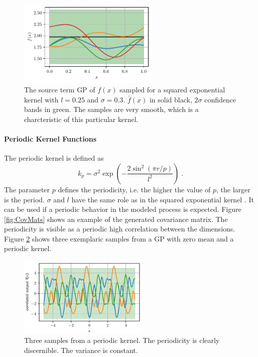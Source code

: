 \documentclass[%
  a4paper,oneside,%
  11pt,%
  smallchapters,
  style=printdev,
  extramargin,
  green,%
  rgb, <cmyk>
  ]{tubsbook}
\begin{document}
\begin{figure}[!ht]
\begin{center}

\includegraphics[width=0.6\textwidth]{pics/sqexp_f_sampled}
\caption[Samples from a GP with squared exponential kernel]{The source term GP of $f(x)$ sampled for a squared exponential kernel with $l = 0.25$ and $\sigma = 0.3$. $\bar{f}(x)$ in solid black, $2\sigma$ confidence bands in green. The samples are very smooth, which is a charcteristic of this particular kernel.}
\label{fig:Sqexp}

\end{center}
\end{figure}

\paragraph{Periodic Kernel Functions}
The periodic kernel is defined as
\begin{equation}
k_p = \sigma^2 \exp(- \frac{2 \sin^2 (\pi r /p)}{l^2}) \;.
\end{equation}
The parameter $p$ defines the periodicity, i.e. the higher the value of $p$, the larger is the period.  $\sigma$ and $l$ have the same role as in the squared exponential kernel \cite{Duvenaud}. 
It can be used if a periodic behavior in the modeled process is expected. Figure \ref{fig:CovMats} shows an example of the generated covariance matrix. The periodicity is visible as a periodic high correlation between the dimensions. Figure \ref{fig:Periodic} shows three exemplaric samples from a GP with zero mean and a periodic kernel.
\begin{figure}[!ht]
\begin{center}
\includegraphics[width=0.55\textwidth]{pics/PeriodicKernel.pdf}
\caption[Samples from a GP with a periodic kernel]{Three samples from a periodic kernel. The periodicity is clearly discernible. The variance is constant.}
\label{fig:Periodic}
\end{center}
\end{figure}
\end{document}
